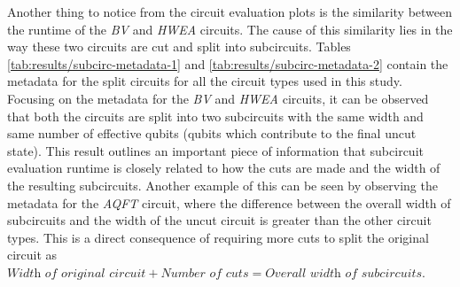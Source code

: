 %
%
\vspace{\baselineskip}
Another thing to notice from the circuit evaluation plots is the similarity between the runtime of the \textit{BV} and \textit{HWEA} circuits. The cause of this similarity lies in the way these two circuits are cut and split into subcircuits. Tables \ref{tab:results/subcirc-metadata-1} and \ref{tab:results/subcirc-metadata-2} contain the metadata for the split circuits for all the circuit types used in this study. Focusing on the metadata for the \textit{BV} and \textit{HWEA} circuits, it can be observed that both the circuits are split into two subcircuits with the same width and same number of effective qubits (qubits which contribute to the final uncut state). This result outlines an important piece of information that subcircuit evaluation runtime is closely related to how the cuts are made and the width of the resulting subcircuits. Another example of this can be seen by observing the metadata for the \textit{AQFT} circuit, where the difference between the overall width of subcircuits and the width of the uncut circuit is greater than the other circuit types. This is a direct consequence of requiring more cuts to split the original circuit as $ \textit{Width of original circuit} + \textit{Number of cuts} = \textit{Overall width of subcircuits} $.



